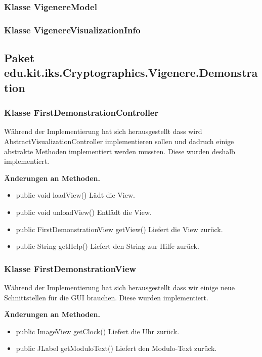 \documentclass{article}
\begin{document}
    \subsubsection{Klasse VigenereModel}

    \subsubsection{Klasse VigenereVisualizationInfo}

  \subsection{Paket edu.kit.iks.Cryptographics.Vigenere.Demonstration}
    \subsubsection{Klasse FirstDemonstrationController}
	Während der Implementierung hat sich herausgestellt dass wird AbstractVisualizationController implementieren sollen und dadruch 
	einige abstrakte Methoden implementiert werden mussten. Diese wurden deshalb implementiert.\newline
           
    \textbf{Änderungen an Methoden.}
      \begin{itemize}
		\item public void loadView()\newline
              Lädt die View.
        \item public void unloadView()\newline
              Entlädt die View.
        \item public FirstDemonstrationView getView()\newline
              Liefert die View zurück.
        \item public String getHelp()\newline
              Liefert den String zur Hilfe zurück.
      \end{itemize}
	  
    \subsubsection{Klasse FirstDemonstrationView}
	Während der Implementierung hat sich herausgestellt dass wir einige neue Schnittstellen für die GUI brauchen. Diese wurden implementiert.\newline
           
    \textbf{Änderungen an Methoden.}
      \begin{itemize}
        \item public ImageView getClock()\newline
              Liefert die Uhr zurück.
        \item public JLabel getModuloText()\newline
              Liefert den Modulo-Text zurück.
      \end{itemize}
\end{document}
